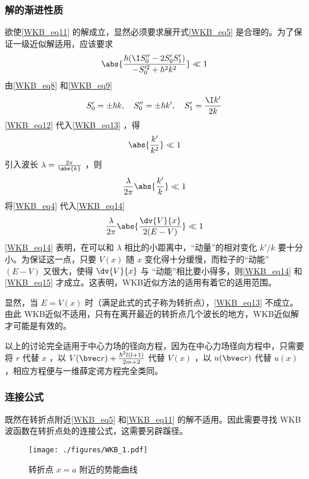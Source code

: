 \subsubsection{解的渐进性质}
欲使\autoref{WKB_eq11} 的解成立，显然必须要求展开式\autoref{WKB_eq5} 是合理的。为了保证一级近似解适用，应该要求
\begin{equation}\label{WKB_eq13}
\abs{\frac{\hbar(\I S_0''-2S_0'S_1')}{-S_0'^2+\hbar^2k^2}}\ll1
\end{equation}
由\autoref{WKB_eq8} 和\autoref{WKB_eq9} 
\begin{equation}\label{WKB_eq12}
S_0'=\pm\hbar k,\quad S_0''=\pm\hbar k',\quad S_1'=\frac{\I k'}{2k}
\end{equation}
\autoref{WKB_eq12} 代入\autoref{WKB_eq13} ，得
\begin{equation}
\abs{\frac{k'}{k^2}}\ll1
\end{equation}
引入波长 $\lambda=\frac{2\pi}{\abs{k}}$ ，则
\begin{equation}\label{WKB_eq14}
\frac{\lambda}{2\pi}\abs{\frac{k'}{k}}\ll1
\end{equation}
将\autoref{WKB_eq4} 代入\autoref{WKB_eq14} 
\begin{equation}\label{WKB_eq15}
\frac{\lambda}{2\pi}\abs{\frac{\dv{V}{x}}{2(E-V)}}\ll1
\end{equation}
\autoref{WKB_eq14} 表明，在可以和 $\lambda$ 相比的小距离中，“动量”的相对变化 $k'/k$ 要十分小。为保证这一点，只要 $V(x)$ 随 $x$ 变化得十分缓慢，而粒子的“动能” $(E-V)$ 又很大，使得 $\dv{V}{x}$ 与 “动能”相比要小得多，则\autoref{WKB_eq14} 和\autoref{WKB_eq15} 才成立。这表明，WKB近似方法的适用有着它的适用范围。

显然，当 $E=V(x)$ 时（满足此式的式子称为转折点），\autoref{WKB_eq13} 不成立。由此 WKB近似不适用，只有在离开最近的转折点几个波长的地方，WKB近似解才可能是有效的。

以上的讨论完全适用于中心力场的径向方程，因为在中心力场径向方程中，只需要将 $r$ 代替 $x$ ，以 $V(\bvec r)+\frac{\hbar^2l(l+1)}{2m+2}$ 代替 $V(x)$ ，以 $u(\bvec r)$ 代替 $u(x)$ ，相应方程便与一维薛定谔方程完全类同。
\subsubsection{连接公式}
既然在转折点附近\autoref{WKB_eq5} 和\autoref{WKB_eq11} 的解不适用。因此需要寻找 WKB波函数在转折点处的连接公式，这需要另辟蹊径。
\begin{figure}[ht]
\centering
\texttt{[image: ./figures/WKB\_1.pdf]}
\caption{转折点 $x=a$ 附近的势能曲线} \label{WKB_fig1}
\end{figure}

